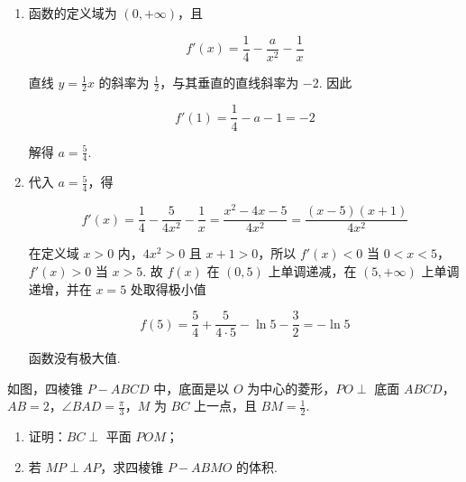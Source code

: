 \begin{solution}
\begin{enumerate}
\item 函数的定义域为 \((0,+\infty)\)，且

\[
f'(x)=\frac14-\frac{a}{x^2}-\frac1x
\]

直线 \(y=\frac12x\) 的斜率为 \(\frac12\)，与其垂直的直线斜率为 \(-2\). 因此

\[
f'(1)=\frac14-a-1=-2
\]

解得 \(a=\frac54\).

\item 代入 \(a=\frac54\)，得

\[
f'(x)=\frac14-\frac5{4x^2}-\frac1x
=\frac{x^2-4x-5}{4x^2}
=\frac{(x-5)(x+1)}{4x^2}
\]

在定义域 \(x>0\) 内，\(4x^2>0\) 且 \(x+1>0\)，所以 \(f'(x)<0\) 当 \(0<x<5\)，\(f'(x)>0\) 当 \(x>5\). 故 \(f(x)\) 在 \((0,5)\) 上单调递减，在 \((5,+\infty)\) 上单调递增，并在 \(x=5\) 处取得极小值

\[
f(5)=\frac54+\frac{5}{4\cdot5}-\ln5-\frac32=-\ln5
\]

函数没有极大值.
\end{enumerate}
\end{solution}

\begin{problem}
如图，四棱锥 \(P - ABCD\) 中，底面是以 \(O\) 为中心的菱形，\(PO \perp\) 底面 \(ABCD\)，\(AB = 2\)，\(\angle BAD = \frac{\pi}{3}\)，\(M\) 为 \(BC\) 上一点，且 \(BM = \frac{1}{2}\).

\begin{enumerate}
\item 证明：\(BC \perp\) 平面 \(POM\)；
\item 若 \(MP \perp AP\)，求四棱锥 \(P - ABMO\) 的体积.
\end{enumerate}

\end{problem}

